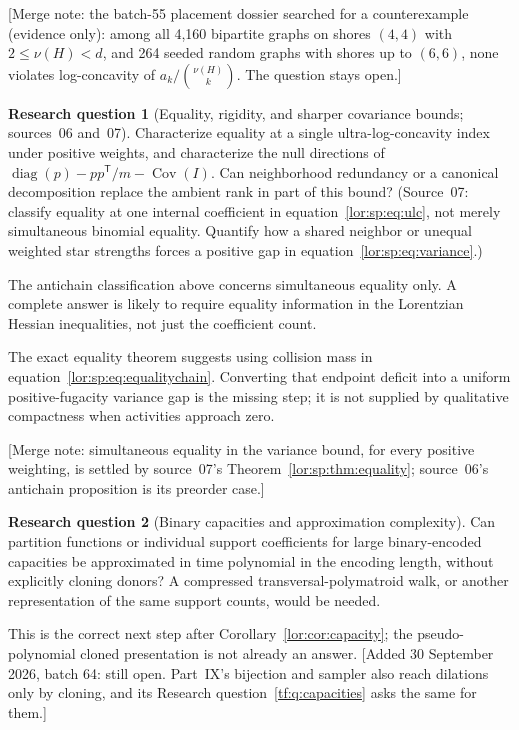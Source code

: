 \documentclass[11pt]{article}
\numberwithin{equation}{section}
\theoremstyle{definition}
\newtheorem{question}{Research question}%
\newcommand{\diag}{\operatorname{diag}}
\newcommand{\Cov}{\operatorname{Cov}}
\begin{document}
[Merge note: the batch-55 placement dossier searched for a counterexample
(evidence only): among all 4,160 bipartite graphs on shores $(4,4)$ with
$2\le\nu(H)<d$, and 264 seeded random graphs with shores up to $(6,6)$, none
violates log-concavity of $a_k/\binom{\nu(H)}k$. The question stays open.]

\begin{question}[Equality, rigidity, and sharper covariance bounds; sources~06 and~07]\label{lor:q:equality}
Characterize equality at a single ultra-log-concavity index under positive
weights, and characterize the null directions of
$\diag(p)-pp^{\mathsf T}/m-\Cov(I)$. Can neighborhood redundancy or a
canonical decomposition replace the ambient rank in part of this bound?
(Source~07: classify equality at one internal coefficient in equation~\eqref{lor:sp:eq:ulc}, not merely
simultaneous binomial equality. Quantify how a shared neighbor or unequal
weighted star strengths forces a positive gap in equation~\eqref{lor:sp:eq:variance}.)
\end{question}
The antichain classification above concerns simultaneous equality only.
A complete answer is likely to require equality information in the
Lorentzian Hessian inequalities, not just the coefficient count.

The exact equality theorem suggests using collision mass in
equation~\eqref{lor:sp:eq:equalitychain}. Converting that endpoint deficit into a uniform
positive-fugacity variance gap is the missing step; it is not supplied by
qualitative compactness when activities approach zero.

[Merge note: simultaneous equality in the variance bound, for every
positive weighting, is settled by source~07's
Theorem~\ref{lor:sp:thm:equality}; source~06's antichain proposition is its
preorder case.]

\begin{question}[Binary capacities and approximation complexity]\label{tf:hq:capacities}%
Can partition functions or individual support coefficients for large
binary-encoded capacities be approximated in time polynomial in the
encoding length, without explicitly cloning donors? A compressed
transversal-polymatroid walk, or another representation of the same
support counts, would be needed.
\end{question}
This is the correct next step after Corollary~\ref{lor:cor:capacity}; the
pseudo-polynomial cloned presentation is not already an answer.
[Added 30 September 2026, batch 64: still open. Part~IX's bijection and
sampler also reach dilations only by cloning, and its Research
question~\ref{tf:q:capacities} asks the same for them.]
\end{document}
